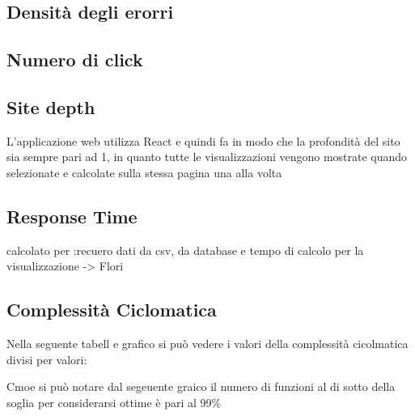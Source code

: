 \subsection{Densità degli erorri}
\subsection{Numero di click}
\subsection{Site depth}
L'applicazione web utilizza React e quindi fa in modo che la profondità del sito sia sempre pari ad 1, in quanto tutte le visualizzazioni vengono mostrate quando selezionate e calcolate sulla stessa pagina una alla volta

\subsection{Response Time}
calcolato per :recuero dati da csv, da database e tempo di calcolo per la visualizzazione -> Flori

\subsection{Complessità Ciclomatica}
Nella seguente tabell e grafico si può vedere i valori della complessità cicolmatica divisi per valori:

    Cmoe si può notare dal segeuente graico il numero di funzioni al di sotto della soglia per considerarsi ottime è pari al 99\%


